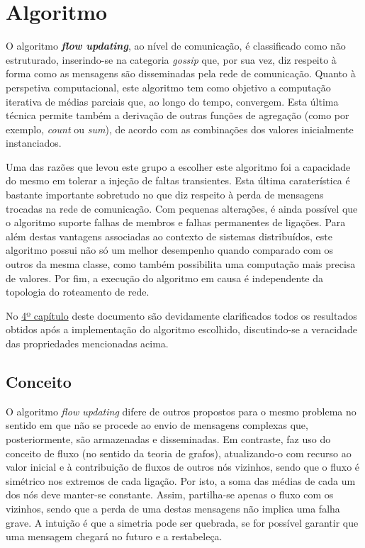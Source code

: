 \documentclass[a4paper]{report}
\begin{document}
{\let\clearpage\relax \chapter{Algoritmo} \label{ch:Algorithm}}
\large{
	O algoritmo \textbf{\textit{flow updating}}, ao nível de comunicação, é classificado como não estruturado, inserindo-se na categoria \textit{gossip} que, por sua vez, diz respeito à forma como as mensagens são disseminadas pela rede de comunicação.
	Quanto à perspetiva computacional, este algoritmo tem como objetivo a computação iterativa de médias parciais que, ao longo do tempo, convergem.
	Esta última técnica permite também a derivação de outras funções de agregação (como por exemplo, \textit{count} ou \textit{sum}), de acordo com as combinações dos valores inicialmente instanciados.

	Uma das razões que levou este grupo a escolher este algoritmo foi a capacidade do mesmo em tolerar a injeção de faltas transientes. 
	Esta última caraterística é bastante importante sobretudo no que diz respeito à perda de mensagens trocadas na rede de comunicação.
	Com pequenas alterações, é ainda possível que o algoritmo suporte falhas de membros e falhas permanentes de ligações.
	Para além destas vantagens associadas ao contexto de sistemas distribuídos, este algoritmo possui não só um melhor desempenho quando comparado com os outros da mesma classe, como também possibilita uma computação mais precisa de valores.
	Por fim, a execução do algoritmo em causa é independente da topologia do roteamento de rede.

	No \hyperref[ch:Analysis of results]{4º capítulo} deste documento são devidamente clarificados todos os resultados obtidos após a implementação do algoritmo escolhido, discutindo-se a veracidade das propriedades mencionadas acima.

	\section{Conceito} \label{sec:Concept}
	O algoritmo \textit{flow updating} difere de outros propostos para o mesmo problema no sentido em que não se procede ao envio de mensagens complexas que, posteriormente, são armazenadas e disseminadas.
	Em contraste, faz uso do conceito de fluxo (no sentido da teoria de grafos), atualizando-o com recurso ao valor inicial e à contribuição de fluxos de outros nós vizinhos, sendo que o fluxo é simétrico nos extremos de cada ligação. Por isto, a soma das médias de cada um dos nós deve manter-se constante.
	Assim, partilha-se apenas o fluxo com os vizinhos, sendo que a perda de uma destas mensagens não implica uma falha grave.
	A intuição é que a simetria pode ser quebrada, se for possível garantir que uma mensagem chegará no futuro e a restabeleça.

}
\end{document}
